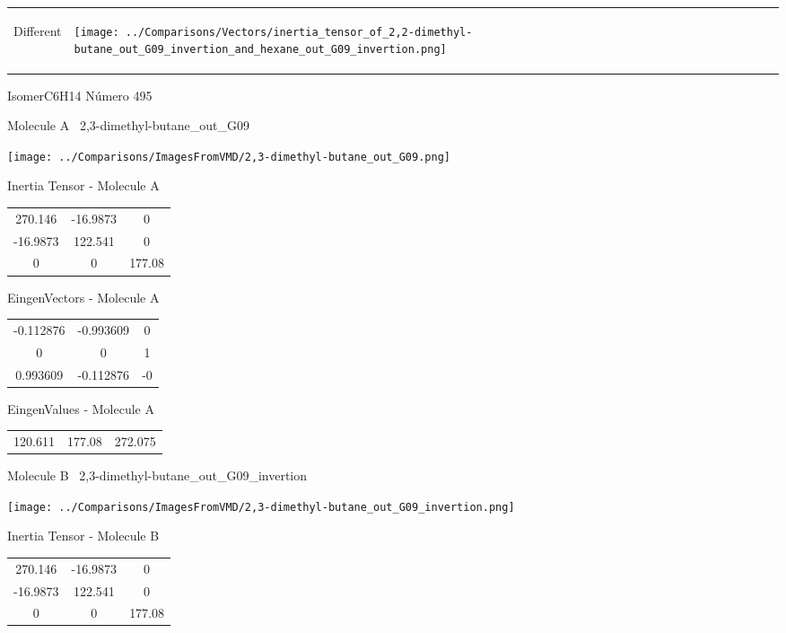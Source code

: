 \vtab[-5mm]
\begin{tabular}{*{2}{m{}}}
\begin{center}
\textcolor{NavyBlue}{\Large Different}
\end{center}
&
\begin{center}
\texttt{[image: ../Comparisons/Vectors/inertia\_tensor\_of\_2,2-dimethyl-butane\_out\_G09\_invertion\_and\_hexane\_out\_G09\_invertion.png]}
\end{center}
\end{tabular}

 \newpage

\vtab[-3cm]
\begin{center}
{\large IsomerC6H14 \tab Número 495}
\end{center}
\begin{multicols}{2}
\begin{center}

Molecule A \
2,3-dimethyl-butane\_out\_G09

\texttt{[image: ../Comparisons/ImagesFromVMD/2,3-dimethyl-butane\_out\_G09.png]}

Inertia Tensor - Molecule A \\
\begin{tabular}{|c c c|}
270.146	 & 	-16.9873	 & 	0	 \\
-16.9873	 & 	122.541	 & 	0	 \\
0	 & 	0	 & 	177.08
\end{tabular}

\vtab
 EingenVectors - Molecule A     \\
\begin{tabular}{|c c c|}
-0.112876	 & 	-0.993609	 & 	0	 \\
0	 & 	0	 & 	1	 \\
0.993609	 & 	-0.112876	 & 	-0
\end{tabular}

\vtab
 EingenValues - Molecule A     \\
\begin{tabular}{|c c c|}
120.611	 & 	177.08	 & 	272.075	 \\
\end{tabular}
\columnbreak

Molecule B \
2,3-dimethyl-butane\_out\_G09\_invertion

\texttt{[image: ../Comparisons/ImagesFromVMD/2,3-dimethyl-butane\_out\_G09\_invertion.png]}

Inertia Tensor - Molecule B \\
\begin{tabular}{|c c c|}
270.146	 & 	-16.9873	 & 	0	 \\
-16.9873	 & 	122.541	 & 	0	 \\
0	 & 	0	 & 	177.08
\end{tabular}


\end{center}
\end{multicols}
